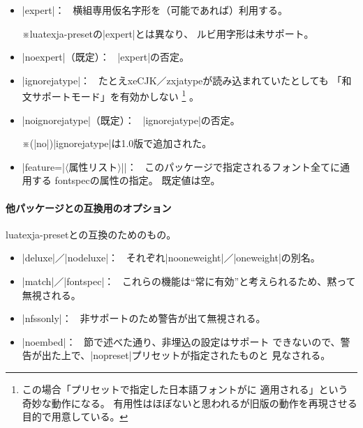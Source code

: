 \documentclass[xelatex,ja=standard,jafont=haranoaji,
  a4paper]{bxjsarticle}
\newcommand*{\EG}{\eghostguarded}
\newcommand{\Pkg}[1]{\textsf{#1}}
\newcommand{\Meta}[1]{$\langle$\mbox{}#1\mbox{}$\rangle$}
\newcommand{\Note}{\par\noindent ※}
\newcommand{\Means}{：\ }
\newcommand{\JEmph}{\textgt}
\newcommand{\JSl}{\mbox{／}\linebreak[0]}
\begin{document}
\begin{itemize}
\item |expert|\Means
横組専用仮名字形を（可能であれば）利用する。
\Note \Pkg{luatexja-preset}の|expert|とは異なり、
ルビ用字形は未サポート。
\item |noexpert|（既定）\Means
|expert|の否定。

\item |ignorejatype|\Means
たとえ\Pkg{xeCJK}\JSl\Pkg{zxjatype}が読み込まれていたとしても
「和文サポートモード」を有効かしない%
\footnote{この場合「プリセットで指定した日本語フォントが\JEmph{欧文のみ}に
適用される」という奇妙な動作になる。
有用性はほぼないと思われるが旧版の動作を再現させる目的で用意している。}%
。
\item |noignorejatype|（既定）\Means
|ignorejatype|の否定。
\Note (|no|)|ignorejatype|は1.0版で追加された。

\item |feature={|\Meta{属性リスト}|}|\Means
このパッケージで指定されるフォント全てに通用する
\Pkg{fontspec}の属性の指定。
既定値は空。

\end{itemize}

\paragraph{他パッケージとの互換用のオプション}
\Pkg{luatexja-preset}との互換のためのもの。

\begin{itemize}
\item |deluxe|\JSl|nodeluxe|\Means
  それぞれ|nooneweight|\JSl|oneweight|の別名。
\item |match|\JSl|fontspec|\Means
  これらの機能は“常に有効”と考えられるため、黙って無視される。
\item |nfssonly|\Means
  非サポートのため警告が出て無視される。
\item |noembed|\Means
  \EG{\ref{ssec:Main-Option}}節で述べた通り、非埋込の設定はサポート
  できないので、警告が出た上で、|nopreset|プリセットが指定されたものと
  見なされる。
\end{itemize}

\end{document}
